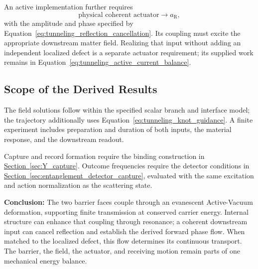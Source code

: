 An active implementation further requires
\begin{equation}
    \text{physical coherent actuator}\longrightarrow a_{\mathrm R},
    \label{eq:tunneling_actuator_bridge}
\end{equation}
with the amplitude and phase specified by Equation~\eqref{eq:tunneling_reflection_cancellation}. Its coupling must excite the appropriate downstream matter field. Realizing that input without adding an independent localized defect is a separate actuator requirement; its supplied work remains in Equation~\eqref{eq:tunneling_active_current_balance}.

\subsection{Scope of the Derived Results}

The field solutions follow within the specified scalar branch and interface model; the trajectory additionally uses Equation~\eqref{eq:tunneling_knot_guidance}. A finite experiment includes preparation and duration of both inputs, the material response, and the downstream readout.

Capture and record formation require the binding construction in \hyperref[sec:Y_capture]{Section~\ref*{sec:Y_capture}}. Outcome frequencies require the detector conditions in \hyperref[sec:entanglement_detector_capture]{Section~\ref*{sec:entanglement_detector_capture}}, evaluated with the same excitation and action normalization as the scattering state.

\noindent\textbf{Conclusion:}
The two barrier faces couple through an evanescent Active-Vacuum deformation, supporting finite transmission at conserved carrier energy. Internal structure can enhance that coupling through resonance; a coherent downstream input can cancel reflection and establish the derived forward phase flow. When matched to the localized defect, this flow determines its continuous transport. The barrier, the field, the actuator, and receiving motion remain parts of one mechanical energy balance.
